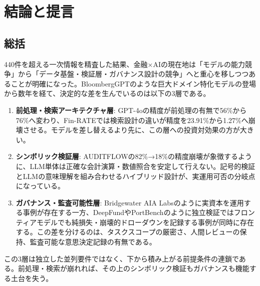 \section{結論と提言}
\label{sec:conclusion}

\subsection{総括}

440件を超える一次情報を精査した結果、金融×AIの現在地は「モデルの能力競争」から「データ基盤・検証層・ガバナンス設計の競争」へと重心を移しつつあることが明確になった。BloombergGPTのような巨大ドメイン特化モデルの登場から数年を経て、決定的な差を生んでいるのは以下の3層である。

\begin{enumerate}
  \item \textbf{前処理・検索アーキテクチャ層}: GPT-4oの精度が前処理の有無で56\%から76\%へ変わり\cite{multistructured2025}、Fin-RATEでは検索設計の違いが精度を23.91\%から1.27\%へ崩壊させる\cite{finrate2026}。モデルを差し替えるより先に、この層への投資対効果の方が大きい。
  \item \textbf{シンボリック検証層}: AUDITFLOWの82\%→18\%の精度崩壊が象徴するように\cite{auditflow2026}、LLM単体は正確な会計演算・数値照合を安定して行えない。記号的検証とLLMの意味理解を組み合わせるハイブリッド設計が、実運用可否の分岐点になっている。
  \item \textbf{ガバナンス・監査可能性層}: Bridgewater AIA Labsのように実資本を運用する事例が存在する一方\cite{bridgewater_aialabs_nd}、DeepFund\cite{deepfund2025}やPortBench\cite{portbench2026}のように独立検証ではフロンティアモデルでも純損失・崩壊的ドローダウンを記録する事例が同時に存在する。この差を分けるのは、タスクスコープの厳密さ、人間レビューの保持、監査可能な意思決定記録の有無である。
\end{enumerate}

この3層は独立した並列要件ではなく、下から積み上がる前提条件の連鎖である。前処理・検索が崩れれば、その上のシンボリック検証もガバナンスも機能する土台を失う。

